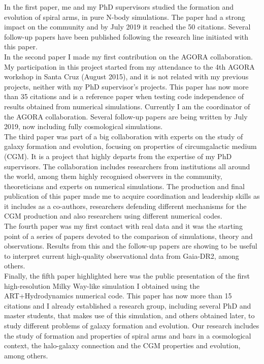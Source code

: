 \documentclass[oneside, a4paper, onecolumn, 11pt]{article}
\begin{document}
{In the first paper, me and my PhD supervisors studied the formation and evolution of spiral arms, in pure N-body simulations. The paper had a strong impact on the community and by July 2019 it reached the 50 citations. Several follow-up papers have been published following the research line initiated with this paper.\\
In the second paper I made my first contribution on the AGORA collaboration. My participation in this project started from my attendance to the 4th AGORA workshop in Santa Cruz (August 2015), and it is not related with my previous projects, neither with my PhD supervisor's projects. This paper has now more than 35 citations and is a reference paper when testing code independence of results obtained from numerical simulations. Currently I am the  coordinator of the AGORA collaboration. Several follow-up papers are being written by July 2019, now including fully cosmological simulations.\\
The third paper was part of a big collaboration with experts on the study of galaxy formation and evolution, focusing on properties of circumgalactic medium (CGM). It is a project that highly departs from the expertise of my PhD supervisors. The collaboration includes researchers from institutions all around the world, among them highly recognised observers in the community, theoreticians and experts on numerical simulations. The production and final publication of this paper made me to acquire coordination and leadership skills as it includes as a co-authors, researchers defending different mechanisms for the CGM production and also researchers using different numerical codes.\\
The fourth paper was my first contact with real data and it was the starting point of a series of papers devoted to the comparison of simulations, theory and observations. Results from this and the follow-up papers are showing to be useful to interpret current high-quality observational data from Gaia-DR2, among others.\\ 
Finally, the fifth paper highlighted here was the public presentation of the first high-resolution Milky Way-like simulation I obtained using the ART+Hydrodynamics numerical code. This paper has now more than 15 citations and I already established a research group, including several PhD and master students, that makes use of this simulation, and others obtained later, to study different problems of galaxy formation and evolution. Our research includes the study of formation and properties of spiral arms and bars in a cosmological context, the halo-galaxy connection and the CGM properties and evolution, among others.

}
\end{document}
